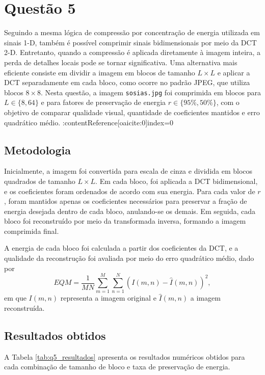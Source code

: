 \documentclass[12pt,a4paper]{article}
\begin{document}
\section{Questão 5}

Seguindo a mesma lógica de compressão por concentração de energia utilizada em sinais 1-D, também é possível comprimir sinais bidimensionais por meio da DCT 2-D. Entretanto, quando a compressão é aplicada diretamente à imagem inteira, a perda de detalhes locais pode se tornar significativa. Uma alternativa mais eficiente consiste em dividir a imagem em blocos de tamanho \(L \times L\) e aplicar a DCT separadamente em cada bloco, como ocorre no padrão JPEG, que utiliza blocos \(8 \times 8\). Nesta questão, a imagem \texttt{sosias.jpg} foi comprimida em blocos para \(L \in \{8,64\}\) e para fatores de preservação de energia \(r \in \{95\%,50\%\}\), com o objetivo de comparar qualidade visual, quantidade de coeficientes mantidos e erro quadrático médio. :contentReference[oaicite:0]{index=0}

\subsection{Metodologia}

Inicialmente, a imagem foi convertida para escala de cinza e dividida em blocos quadrados de tamanho \(L \times L\). Em cada bloco, foi aplicada a DCT bidimensional, e os coeficientes foram ordenados de acordo com sua energia. Para cada valor de \(r\), foram mantidos apenas os coeficientes necessários para preservar a fração de energia desejada dentro de cada bloco, anulando-se os demais. Em seguida, cada bloco foi reconstruído por meio da transformada inversa, formando a imagem comprimida final.

A energia de cada bloco foi calculada a partir dos coeficientes da DCT, e a qualidade da reconstrução foi avaliada por meio do erro quadrático médio, dado por
\[
EQM=\frac{1}{MN}\sum_{m=1}^{M}\sum_{n=1}^{N}\left(I(m,n)-\hat{I}(m,n)\right)^2,
\]
em que \(I(m,n)\) representa a imagem original e \(\hat{I}(m,n)\) a imagem reconstruída.

\subsection{Resultados obtidos}

A Tabela \ref{tab:q5_resultados} apresenta os resultados numéricos obtidos para cada combinação de tamanho de bloco e taxa de preservação de energia.
\end{document}
